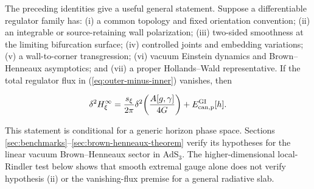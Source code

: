 The preceding identities give a useful general statement. Suppose a differentiable regulator family has: (i) a common topology and fixed orientation convention; (ii) an integrable or source-retaining wall polarization; (iii) two-sided smoothness at the limiting bifurcation surface; (iv) controlled joints and embedding variations; (v) a wall-to-corner transgression; (vi) vacuum Einstein dynamics and Brown--Henneaux asymptotics; and (vii) a proper Hollands--Wald representative. If the total regulator flux in (\ref{eq:outer-minus-inner}) vanishes, then

\begin{align}
\delta^2H_\xi^\infty
=\frac{s_\xi}{2\pi}
\delta^2\!\left(\frac{A[g,\gamma]}{4G}\right)
+E_{{\rm can,p}}^{\rm GI}[h]. \label{eq:conditional-horizon-identity}
\end{align}

This statement is conditional for a generic horizon phase space. Sections \ref{sec:benchmarks}--\ref{sec:brown-henneaux-theorem} verify its hypotheses for the linear vacuum Brown--Henneaux sector in AdS$_3$. The higher-dimensional local-Rindler test below shows that smooth extremal gauge alone does not verify hypothesis (ii) or the vanishing-flux premise for a general radiative slab.
